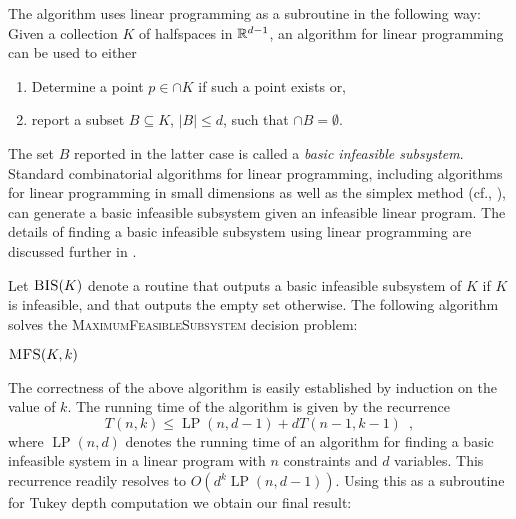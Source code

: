 \documentclass[12pt]{article}
\DeclareMathOperator{\lp}{LP}
\begin{document}
The algorithm uses linear programming as a subroutine in the following
way:  Given a collection $K$ of halfspaces in $\mathbb{R}^{d-1}$, an algorithm
for linear programming can be used to either
\begin{enumerate}
\item Determine a point $p\in\cap K$ if such a point exists or,
\item report a subset $B\subseteq K$, $|B|\le d$, such that 
	$\cap B=\emptyset$.
\end{enumerate}
The set $B$ reported in the latter case is called a \emph{basic
infeasible subsystem}.  Standard combinatorial algorithms for linear
programming, including algorithms for linear programming in small
dimensions \cite{c95,d84,m83,m84,s91,sw92} as well as the simplex
method (cf., \cite{chvatal80}), can generate a basic infeasible
subsystem given an infeasible linear program.  The details of finding
a basic infeasible subsystem using linear programming are discussed
further in .

Let $\textsc{BIS}(K)$ denote a routine that outputs a basic infeasible
subsystem of $K$ if $K$ is infeasible, and that outputs the empty set
otherwise.  The following algorithm solves the
\textsc{MaximumFeasibleSubsystem} decision problem:

\noindent\begin{minipage}{\textwidth}
\noindent$\textsc{MFS}(K,k)$
\begin{algorithmic}[1]
\ENDIF
{}
\ENDIF
{}
   \ENDIF
\ENDFOR
{}
\end{algorithmic}
\end{minipage}

The correctness of the above algorithm is easily established by
induction on the value of $k$.  The running time of the algorithm is
given by the recurrence
\[
    T(n,k) \le \lp(n,d-1)+ dT(n-1,k-1) \enspace ,
\]
where $\lp(n,d)$ denotes the running time of an algorithm for finding
a basic infeasible system in a linear program with $n$ constraints and
$d$ variables.  This recurrence readily resolves to
$O(d^k\lp(n,d-1))$.  
Using this as a subroutine for Tukey depth computation we obtain our
final result:
\end{document}
